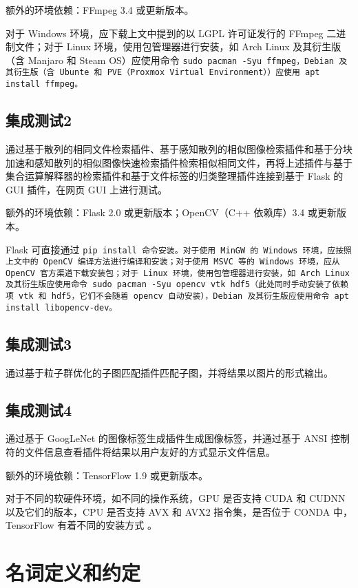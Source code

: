 额外的环境依赖：FFmpeg 3.4 或更新版本。

对于 Windows 环境，应下载上文中提到的以 LGPL 许可证发行的 FFmpeg 二进制文件；对于 Linux 环境，使用包管理器进行安装，如 Arch Linux 及其衍生版（含 Manjaro 和 Steam OS）应使用命令 \tt{sudo pacman -Syu ffmpeg}，Debian 及其衍生版（含 Ubunte 和 PVE（Proxmox Virtual Environment））应使用 \tt{apt install ffmpeg}。

\subsection{集成测试2}

通过基于散列的相同文件检索插件、基于感知散列的相似图像检索插件和基于分块加速和感知散列的相似图像快速检索插件检索相似相同文件，再将上述插件与基于集合运算解释器的检索插件和基于文件标签的归类整理插件连接到基于 Flask 的 GUI 插件，在网页 GUI 上进行测试。

额外的环境依赖：Flask 2.0 或更新版本；OpenCV（C++ 依赖库）3.4 或更新版本。

Flask 可直接通过 \tt{pip install} 命令安装。对于使用 MinGW 的 Windows 环境，应按照上文中的 OpenCV 编译方法进行编译和安装；对于使用 MSVC 等的 Windows 环境，应从 OpenCV 官方渠道下载安装包；对于 Linux 环境，使用包管理器进行安装，如 Arch Linux 及其衍生版应使用命令 \tt{sudo pacman -Syu opencv vtk hdf5}（此处同时手动安装了依赖项 \tt{vtk} 和 \tt{hdf5}，它们不会随着 \tt{opencv} 自动安装），Debian 及其衍生版应使用命令 \tt{apt install libopencv-dev}。

\subsection{集成测试3}

通过基于粒子群优化的子图匹配插件匹配子图，并将结果以图片的形式输出。

\subsection{集成测试4}

通过基于 GoogLeNet 的图像标签生成插件生成图像标签，并通过基于 ANSI 控制符的文件信息查看插件将结果以用户友好的方式显示文件信息。

额外的环境依赖：TensorFlow 1.9 或更新版本。

对于不同的软硬件环境，如不同的操作系统，GPU 是否支持 CUDA 和 CUDNN 以及它们的版本，CPU 是否支持 AVX 和 AVX2 指令集，是否位于 CONDA 中，TensorFlow 有着不同的安装方式 \cite{tf}。

\section{名词定义和约定}

